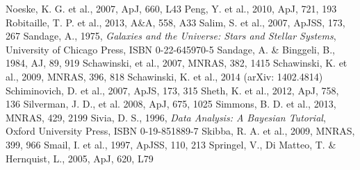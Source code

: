 \documentclass{mn2e}
\begin{document}
\begin{thebibliography}{}
 Noeske, K. G. et al., 2007, ApJ, 660, L43
 Peng, Y. et al., 2010, ApJ, 721, 193
 Robitaille, T. P. et al., 2013, A\&A, 558, A33
 Salim, S. et al., 2007, ApJSS, 173, 267
 Sandage, A., 1975, \emph{Galaxies and the Universe: Stars and Stellar Systems}, University of Chicago Press, ISBN 0-22-645970-5
 Sandage, A. \& Binggeli, B., 1984, AJ, 89, 919
 Schawinski, et al., 2007, MNRAS, 382, 1415
 Schawinski, K. et al., 2009, MNRAS, 396, 818
 Schawinski, K. et al., 2014 (arXiv: 1402.4814)
 Schiminovich, D. et al., 2007, ApJS, 173, 315
 Sheth, K. et al., 2012, ApJ, 758, 136
 Silverman, J. D., et al. 2008, ApJ, 675, 1025
 Simmons, B. D. et al., 2013, MNRAS, 429, 2199
 Sivia, D. S., 1996, \emph{Data Analysis: A Bayesian Tutorial}, Oxford University Press, ISBN 0-19-851889-7
 Skibba, R. A. et al., 2009, MNRAS, 399, 966
 Smail, I. et al., 1997, ApJSS, 110, 213
 Springel, V., Di Matteo, T. \& Hernquist, L., 2005, ApJ, 620, L79

\end{thebibliography}
\end{document}
